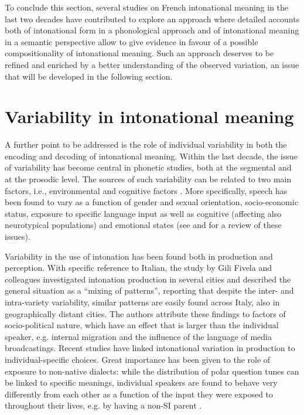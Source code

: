 \documentclass[output=paper,colorlinks,citecolor=brown]{langscibook}
\begin{document}
To conclude this section, several studies on French intonational meaning in the last two decades have contributed to explore an approach where detailed accounts both of intonational form in a phonological approach and of intonational meaning in a semantic perspective allow to give evidence in favour of a possible compositionality of intonational meaning. Such an approach deserves to be refined and enriched by a better understanding of the observed variation, an issue that will be developed in the following section.


\section{Variability in intonational meaning}\label{sec:04:4}
A further point to be addressed is the role of individual variability in both the encoding and decoding of intonational meaning. Within the last decade, the issue of variability has become central in phonetic studies, both at the segmental and at the prosodic level. The sources of such variability can be related to two main factors, i.e., environmental and cognitive factors \citep{kidd2018aa}. More specifically, speech has been found to vary as a function of gender and sexual orientation, socio-economic status, exposure to specific language input as well as cognitive (affecting also neurotypical populations) and emotional states (see \citealt{pierrehumbert2016aa} and \citealt{yu2019aa} for a review of these issues).

Variability in the use of intonation has been found both in production and perception. With specific reference to Italian, the study by Gili Fivela and colleagues \citep{Fivelaetal15} investigated intonation production in several cities and described the general situation as a ``mixing of patterns'', reporting that despite the inter- and intra-variety variability, similar patterns are easily found across Italy, also in geographically distant cities. The authors attribute these findings to factors of socio-political nature, which have an effect that is larger than the individual speaker, e.g. internal migration and the influence of the language of media broadcastings. Recent studies have linked intonational variation in production to individual-specific choices. Great importance has been given to the role of exposure to non-native dialects: while the distribution of polar question tunes can be linked to specific meanings, individual speakers are found to behave very differently from each other as a function of the input they were exposed to throughout their lives, e.g. by having a non-SI parent \citep{orrico19, orrico2020ab}.
\end{document}
